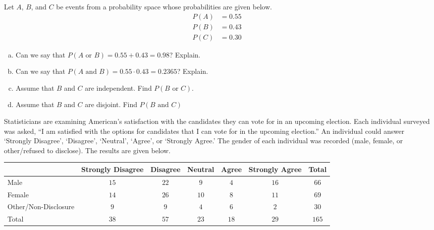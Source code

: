\documentclass[12pt,letterpaper]{exam}
\begin{document}
\examtitle
{} 
\scores
\bottomline
\newpage


\begin{questions}

\newpage
\question[10] Let $A$, $B$, and $C$ be events from a probability space whose probabilities are given below.
	\[
	\begin{aligned}
	P(A)&= 0.55 \\
	P(B)&= 0.43 \\
	P(C)&= 0.30
	\end{aligned}
	\]

\begin{enumerate}[(a)]
\item Can we say that $P(A \text{ or } B)= 0.55 + 0.43= 0.98$? Explain. 
\item Can we say that $P(A \text{ and } B)= 0.55 \cdot 0.43= 0.2365$? Explain. 
\item Assume that $B$ and $C$ are independent. Find $P(B \text{ or } C)$. 
\item Assume that $B$ and $C$ are disjoint. Find $P(B \text{ and } C)$
\end{enumerate}



\newpage
\question[15] Statisticians are examining American's satisfaction with the candidates they can vote for in an upcoming election. Each individual surveyed was asked, ``I am satisfied with the options for candidates that I can vote for in the upcoming election.'' An individual could answer `Strongly Disagree', `Disagree', `Neutral', `Agree', or `Strongly Agree.' The gender of each individual was recorded (male, female, or other/refused to disclose). The results are given below. \par
	\begin{table}[ht]
	\centering
	\begin{tabular}{|l|c|c|c|c|c||c|} \hline 
	& Strongly Disagree & Disagree & Neutral & Agree & Strongly Agree & Total \\ \hline \hline
	Male & $15$ & $22$ & $9$ & $4$ & $16$ & $66$ \\ \hline
	Female & $14$ & $26$ & $10$ & $8$ & $11$ & $69$ \\ \hline
	Other/Non-Disclosure & $9$ & $9$ & $4$ & $6$ & $2$ & $30$ \\ \hline \hline
	Total & $38$ & $57$ & $23$ & $18$ & $29$ & $165$ \\ \hline
	\end{tabular}
	\end{table}


\end{questions}
\end{document}
